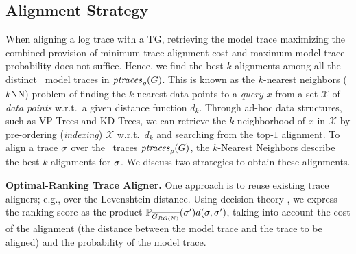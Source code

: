 
\subsection{Alignment Strategy}\label{subsec:as}
When aligning a log trace with a TG, retrieving the model trace maximizing the combined provision of minimum trace alignment cost 
and maximum model trace probability does not suffice.
Hence, we find the best $k$ alignments among all the distinct \unravelled\ model traces in $\mathit{ptraces}_{\rho}(G)$. This is
known as the $k$-nearest neighbors ($k$NN) problem of finding the $k$ nearest data points to a \textit{query} $x$ from a set 
$\mathcal{X}$ of \textit{data points} w.r.t.\ a given distance function $d_k$. Through ad-hoc data structures, such as VP-Trees 
and KD-Trees, %
we can retrieve the $k$-neighborhood of $x$ in $\mathcal{X}$ by pre-ordering (\textit{indexing}) $\mathcal{X}$ w.r.t.\ $d_k$ 
and searching from the top-$1$ alignment.
%
To align a trace $\sigma$ over the \unravelled\ traces $\mathit{ptraces}_{\rho}(G)$,
the $k$-Nearest Neighbors describe the best $k$ alignments for $\sigma$. We discuss two strategies to obtain these
alignments.

\noindent
\textbf{Optimal-Ranking Trace Aligner.}
One approach is to reuse existing trace aligners; e.g., \cite{DBLP:conf/edoc/AdriansyahDA11,LeoniM17} over the Levenshtein 
distance.
Using decision theory \cite{dectheor}, we express the ranking score as the product 
$\mathbb{P}_{\overline{G_{RG(N)}}}({\sigma'}) d(\sigma,{\sigma'})$, taking into account the cost of the alignment (the distance between 
the model trace and the trace to be aligned) and the probability of the model trace.

